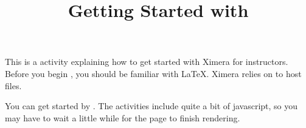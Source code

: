 \documentclass{ximera}
\title{Getting Started with \link[\sf Ximera]{http://ximera.osu.edu}}
\begin{document}
\maketitle

This is a  activity explaining how to get started with Ximera for instructors. 
Before you begin , you should be familiar with \LaTeX.
Ximera relies on  to host files.

You can get started by . The activities include quite a bit of javascript, so you may have to wait a little while for the page to finish rendering.
\end{document}
